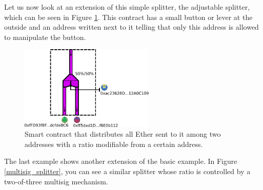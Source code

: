 \documentclass[11pt,letterpaper]{article}
\begin{document}
Let us now look at an extension of this simple splitter, the adjustable splitter,
which can be seen in Figure \ref{adjustable_splitter}.
This contract has a small button or lever at the outside and an address
written next to it telling that only this address is allowed to manipulate the
button.

\begin{figure}
\center
\includegraphics[height=4cm]{adjustable_splitter.pdf}
\caption{Smart contract that distributes all Ether sent to it among
two addresses with a ratio modifiable from a certain address.}
\label{adjustable_splitter}
\end{figure}

The last example shows another extension of the basic example. In Figure
\ref{multisig_splitter}, you can see a similar splitter whose ratio is controlled
by a two-of-three multisig mechanism.
\end{document}
